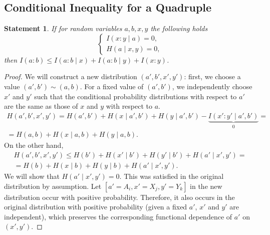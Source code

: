 \documentclass[12pt,sans]{article}
\theoremstyle{definition}
\theoremstyle{plain}
\newtheorem{statement}{Statement}[section]
\theoremstyle{remark}
\begin{document}
\subsection{Conditional Inequality for a Quadruple}
\begin{statement}
    If for random variables \(a, b, x, y\) the following holds
    \[
        \begin{cases}
            I(x:y \mid a) = 0,\\
            H(a \mid x, y) = 0,
        \end{cases}
    \]
    then \(I(a:b) \le I(a:b \mid x) + I(a:b \mid y) + I(x:y)\).
\end{statement}
\begin{proof}
    We will construct a new distribution \((a', b', x', y')\):
    first, we choose a value \((a', b') \sim (a, b)\).
    For a fixed value of \((a', b')\), we independently choose \(x'\) and \(y'\) such that the conditional probability distributions with respect to \(a'\) are the same as those of \(x\) and \(y\) with respect to \(a\).
    \begin{multline*}
    H(a', b', x', y') = H(a', b') + H(x \mid a', b') + H(y \mid a', b') - \underbrace{I(x':y' \mid a', b')}_{0} =\\
    = H(a, b) + H(x \mid a, b) + H(y \mid a, b).
    \end{multline*}
    On the other hand,
    \begin{multline*}
    H(a', b', x', y') \le H(b') + H(x' \mid b') + H(y' \mid b') + H(a' \mid x', y') =\\
    = H(b) + H(x \mid b) + H(y \mid b) + H(a' \mid x', y').
    \end{multline*}
    We will show that \(H(a' \mid x', y') = 0\). This was satisfied in the original distribution by assumption.
    Let \([a' = A_i, x' = X_j, y' = Y_k]\) in the new distribution occur with positive probability. Therefore, it also occurs in the original distribution with positive probability (given a fixed \(a'\), \(x'\) and \(y'\) are independent), which preserves the corresponding functional dependence of \(a'\) on \((x', y')\).


\end{proof}
\end{document}

